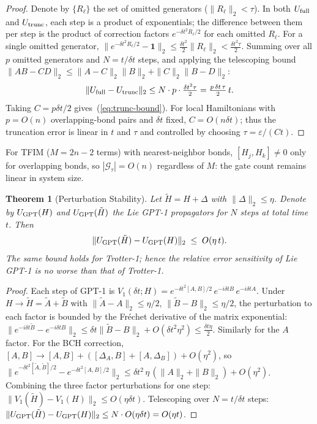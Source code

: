 \documentclass[aps,prxquantum,twocolumn,nofootinbib]{revtex4-2}
\newtheorem{theorem}{Theorem}
\begin{document}
\begin{proof}
  Denote by $\{R_\ell\}$ the set of omitted generators
  ($\|R_\ell\|_2<\tau$).  In both $U_{\rm full}$ and $U_{\rm trunc}$,
  each step is a product of exponentials; the difference between
  them per step is the product of correction factors
  $e^{-\delta t^2 R_\ell/2}$ for each omitted $R_\ell$.
  For a single omitted generator,
  $\|e^{-\delta t^2 R_\ell/2} - \mathbf{1}\|_2
   \leq \tfrac{\delta t^2}{2}\|R_\ell\|_2
   < \tfrac{\delta t^2\tau}{2}$.
  Summing over all $p$ omitted generators and $N=t/\delta t$ steps,
  and applying the telescoping bound
  $\|AB - CD\|_2\leq\|A-C\|_2\|B\|_2+\|C\|_2\|B-D\|_2$:
  \begin{equation*}
    \|U_{\rm full} - U_{\rm trunc}\|_2
    \leq N \cdot p \cdot \tfrac{\delta t^2\tau}{2}
    = \tfrac{p\,\delta t\,\tau}{2}\,t.
  \end{equation*}
  Taking $C=p\delta t/2$ gives~(\ref{eq:trunc-bound}).
  For local Hamiltonians with $p=O(n)$ overlapping-bond pairs
  and $\delta t$ fixed, $C=O(n\delta t)$; thus the truncation
  error is linear in $t$ and $\tau$ and controlled by choosing
  $\tau=\varepsilon/(Ct)$.
\end{proof}

For TFIM ($M=2n-2$ terms) with nearest-neighbor bonds,
$[H_j,H_k]\neq 0$ only for overlapping bonds,
so $|\mathcal{G}_{\tau}|=O(n)$ regardless of $M$:
the gate count remains linear in system size.

\begin{theorem}[Perturbation Stability]
  \label{thm:stability}
  Let $\tilde{H}=H+\Delta$ with $\|\Delta\|_2\leq\eta$.  Denote by
  $U_{\rm GPT}(H)$ and $U_{\rm GPT}(\tilde{H})$ the Lie GPT-1
  propagators for $N$ steps at total time $t$.  Then
  \begin{equation}
    \|U_{\rm GPT}(\tilde{H}) - U_{\rm GPT}(H)\|_2
    \;\leq\; O(\eta\,t).
    \label{eq:stability}
  \end{equation}
  The same bound holds for Trotter-1; hence the relative error
  sensitivity of Lie GPT-1 is no worse than that of Trotter-1.
\end{theorem}

\begin{proof}
  Each step of GPT-1 is
  $V_1(\delta t;H)=e^{-\delta t^2[A,B]/2}\,e^{-i\delta t B}\,e^{-i\delta t A}$.
  Under $H\to\tilde{H}=\tilde{A}+\tilde{B}$ with
  $\|\tilde{A}-A\|_2\leq\eta/2$, $\|\tilde{B}-B\|_2\leq\eta/2$,
  the perturbation to each factor is bounded by
  the Fr\'{e}chet derivative of the matrix exponential:
  $\|e^{-i\delta t\tilde{B}}-e^{-i\delta t B}\|_2
   \leq \delta t\|\tilde{B}-B\|_2+O(\delta t^2\eta^2)
   \leq \tfrac{\delta t\eta}{2}$.
  Similarly for the $A$ factor.  For the BCH correction,
  $[A,B]\to[A,B]+([{\Delta_A},B]+[A,\Delta_B])+O(\eta^2)$,
  so
  $\|e^{-\delta t^2[\tilde{A},\tilde{B}]/2}-e^{-\delta t^2[A,B]/2}\|_2
   \leq \delta t^2\,\eta\,(\|A\|_2+\|B\|_2)+O(\eta^2)$.
  Combining the three factor perturbations for one step:
  $\|V_1(\tilde{H})-V_1(H)\|_2\leq O(\eta\delta t)$.
  Telescoping over $N=t/\delta t$ steps:
  $\|U_{\rm GPT}(\tilde{H})-U_{\rm GPT}(H)\|_2
   \leq N\cdot O(\eta\delta t) = O(\eta t)$.
\end{proof}
\end{document}
